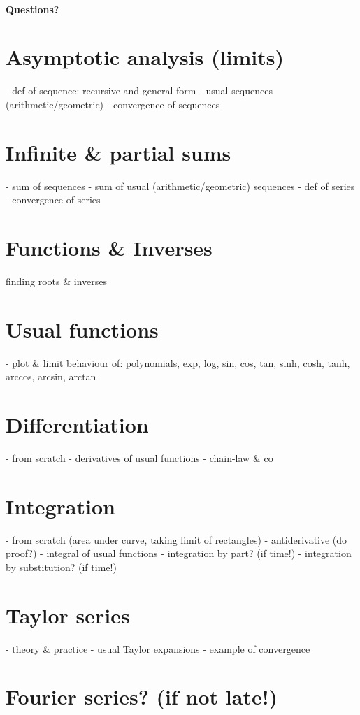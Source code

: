 \documentclass[11pt,a4paper]{article}
\begin{document}
\paragraph{Questions?}
\newpage





\section{Asymptotic analysis (limits)}
- def of sequence: recursive and general form
- usual sequences (arithmetic/geometric)
- convergence of sequences
\section{Infinite \& partial sums}
- sum of sequences
- sum of usual (arithmetic/geometric) sequences
- def of series
- convergence of series

\section{Functions \& Inverses}
finding roots \& inverses
\section{Usual functions}
- plot \& limit behaviour of: polynomials, exp, log, sin, cos, tan, sinh, cosh, tanh, arccos, arcsin, arctan
\section{Differentiation}
- from scratch
- derivatives of usual functions
- chain-law \& co

\section{Integration}
- from scratch (area under curve, taking limit of rectangles)
- antiderivative (do proof?)
- integral of usual functions
- integration by part? (if time!)
- integration by substitution? (if time!)
\section{Taylor series}
- theory \& practice
- usual Taylor expansions
- example of convergence
\section{Fourier series? (if not late!)}
\end{document}
